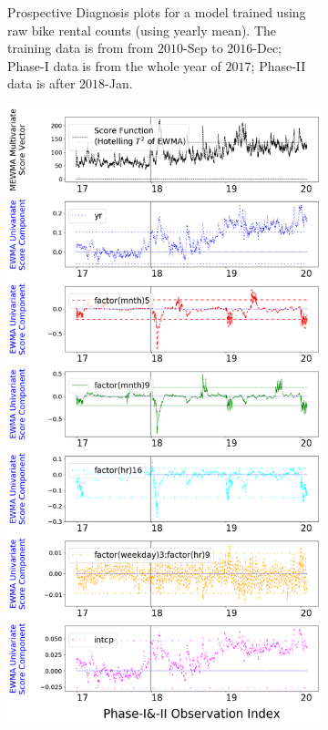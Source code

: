 \documentclass[twoside,11pt]{article}
\begin{document}
\begin{enumerate}
\begin{figure}[H]
\begin{subfigure}[t]{0.32\linewidth}
     \captionsetup{width=.95\linewidth}
     \caption{Prospective Diagnosis plots for a model trained using raw bike rental counts (using yearly mean). The training data is from from $2010$-Sep to $2016$-Dec; Phase-I data is from the whole year of $2017$; Phase-II data is after $2018$-Jan.}
     \label{fig:bs_raw_cnt}
\end{subfigure}
\begin{subfigure}[t]{0.32\linewidth}
     \centering
         \includegraphics[width=1.0\textwidth, trim=.0in .0in .0in .0in, clip]{../figures/v14/bike_sharing/reg_lin_E_1/neg_single_bike_fisher_mlines_with_regu_1e-08_0_0001_0_01_99_99.png}

\end{subfigure}
\end{figure}
\end{enumerate}
\end{document}
